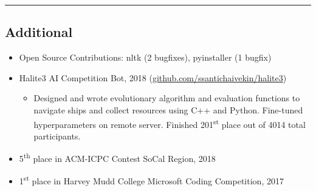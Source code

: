 \documentclass[10pt,letterpaper]{article}
\begin{document}
\vspace{-0.25em}
\hrule
\vspace{-0.55em}
\subsection*{Additional}
  \begin{itemize}
    \parskip=-0.25em
    \item[]
    Open Source Contributions: nltk (2 bugfixes), pyinstaller (1 bugfix)
    \item[]
    Halite3 AI Competition Bot, 2018 (\href{https://github.com/ssantichaivekin/halite3}
    {github.com/ssantichaivekin/halite3})
    \begin{itemize}[label=\textbullet]
        \item  Designed and wrote evolutionary algorithm and evaluation functions to navigate ships and collect resources using C++ and Python. Fine-tuned hyperparameters on remote server. Finished 201\textsuperscript{st} place out of 4014 total participants.
        
    \end{itemize}
    \item[]
    {5\textsuperscript{th} place in ACM-ICPC Contest SoCal Region, 2018}
    \item[]
    {1\textsuperscript{st} place in Harvey Mudd College Microsoft Coding Competition, 2017}
  \end{itemize}

\end{document}
